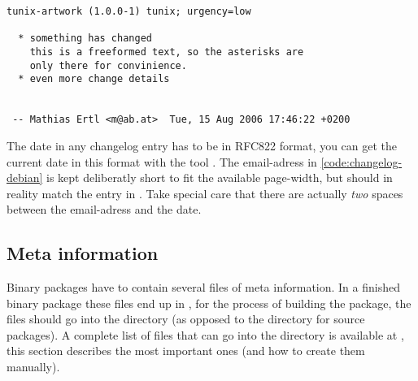 \begin{lstlisting}[label=code:changelog-debian,caption={Example of the
changelog.Debian file}]
tunix-artwork (1.0.0-1) tunix; urgency=low
  
  * something has changed
    this is a freeformed text, so the asterisks are
    only there for convinience.
  * even more change details
 
 
 -- Mathias Ertl <m@ab.at>  Tue, 15 Aug 2006 17:46:22 +0200
\end{lstlisting}
The date in any changelog entry has to be in RFC822 format, you can get the
current date in this format with the tool . The email-adress
in \lstlistingname{} \ref{code:changelog-debian} is kept deliberatly short to
fit the available page-width, but should in reality match the entry in
. Take special care that there are actually \emph{two}
spaces between the email-adress and the date.

\subsection{Meta information}\label{subsection:meta information}
Binary packages have to contain several files of meta information. In a finished
binary package these files end up in , for the process
of building the package, the files should go into the directory 
 (as opposed to the directory  for source
packages). A complete list of files that can go into the
 directory is available at \cite{debian policy manual}, this
section describes the most important ones (and how to create them manually).

